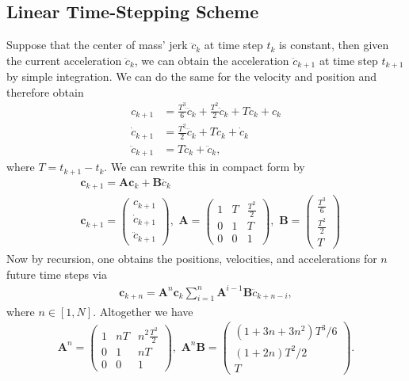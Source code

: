 \subsection{Linear Time-Stepping Scheme}
Suppose that the center of mass' jerk $\dddot{c}_k$ at time step $t_k$ is constant, then given the current acceleration $\ddot{c}_k$, we can obtain the acceleration $\ddot{c}_{k+1}$ at time step $t_{k+1}$ by simple integration. We can do the same for the velocity and position and therefore obtain
\begin{align}
	c_{k+1} &= \frac{T^3}{6}\dddot{c}_k+\frac{T^2}{2}\ddot{c}_k+T\dot{c}_k+c_k\\
	\dot{c}_{k+1} &= \frac{T^2}{2}\dddot{c}_k+T\ddot{c}_k+\dot{c}_k\\
	\ddot{c}_{k+1} &= T\dddot{c}_{k} + \ddot{c}_k,
\end{align}
where $T = t_{k+1}-t_k$. We can rewrite this in compact form by
\begin{align}
	&\bm{c}_{k+1} = \bm{A}\bm{c}_k + \bm{B}\dddot{c}_k \\
	&\bm{c}_{k+1} = \begin{pmatrix}
	c_{k+1} \\
	\dot{c}_{k+1} \\
	\ddot{c}_{k+1}
	\end{pmatrix},\,\,
	\bm{A} = \begin{pmatrix}
	1 & T & \frac{T^2}{2} \\
	0 & 1 & T \\
	0 & 0 & 1
	\end{pmatrix},\,\,
	\bm{B} = \begin{pmatrix}
	\frac{T^3}{6} \\
	\frac{T^2}{2} \\
	T
	\end{pmatrix}
	\label{eq::212_ltss}
\end{align}
Now by recursion, one obtains the positions, velocities, and accelerations for $n$ future time steps via
\begin{align}
	\bm{c}_{k+n} = \bm{A}^n\bm{c}_k\sum_{i=1}^n \bm{A}^{i-1}\bm{B}\dddot{c}_{k+n-i},
	\label{eq::212_preview}
\end{align}
where $n\in[1,N]$. Altogether we have
\begin{align}
	\bm{A}^n = \begin{pmatrix}
	1 & nT & n^2\frac{T^2}{2} \\
	0 & 1 & nT \\
	0 & 0 & 1
	\end{pmatrix},\,\,
	\bm{A}^n\bm{B} = \begin{pmatrix}
	(1+3n+3n^2)T^3/6 \\
	(1+2n)T^2/2 \\
	T
	\end{pmatrix}.
	\label{eq::212_preview_mat}
\end{align}
